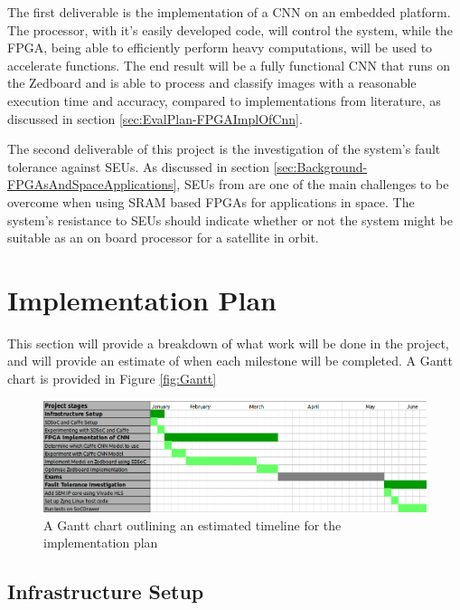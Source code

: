 \documentclass[12pt]{article}
\begin{document}
The first deliverable is the implementation of a CNN on an embedded platform.  The processor, with it's easily developed code, will control the system, while the FPGA, being able to efficiently perform heavy computations, will be used to accelerate functions. The end result will be a fully functional CNN that runs on the Zedboard and is able to process and classify images with a reasonable execution time and accuracy, compared to implementations from literature, as discussed in section \ref{sec:EvalPlan-FPGAImplOfCnn}.

The second deliverable of this project is the investigation of the system's fault tolerance against SEUs. As discussed in section \ref{sec:Background-FPGAsAndSpaceApplications}, SEUs from are one of the main challenges to be overcome when using SRAM based FPGAs for applications in space. The system's resistance to SEUs should indicate whether or not the system might be suitable as an on board processor for a satellite in orbit.

\section{Implementation Plan}
\label{sec:ImpPlan}
\vspace{-12pt}

This section will provide a breakdown of what work will be done in the project, and will provide an estimate of when each milestone will be completed. A Gantt chart is provided in Figure \ref{fig:Gantt}
\begin{figure}

\centering
\includegraphics[width=1\textwidth]{../figures/Gantt}

  \caption{A Gantt chart outlining an estimated timeline for the implementation plan \label{fig:gantt}}

\end{figure}

\subsection{Infrastructure Setup}
\label{sec:ImpPlan-InfSetup}
\vspace{-12pt}
\end{document}
